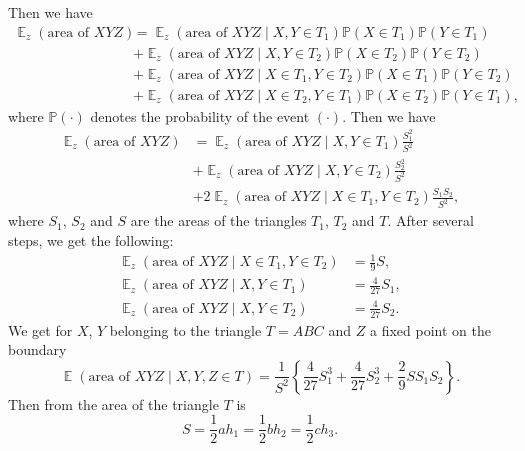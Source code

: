 \documentclass{article}
\DeclareMathOperator{\E}{\mathbb{E}}
\renewcommand{\P}{\mathbb{P}}
\begin{document}
Then we have
\begin{equation*}
    \begin{split}
        \E_{z}(\text{area of }XYZ) &= \E_{z}(\text{area of }XYZ\mid X, Y \in T_{1})\P(X\in T_{1})\P(Y\in T_{1})
        \\
        &+ \E_{z}(\text{area of }XYZ\mid X, Y \in T_{2})\P(X\in T_{2})\P(Y\in T_{2})
        \\
        &+ \E_{z}(\text{area of }XYZ\mid X \in T_{1}, Y \in T_{2})\P(X\in T_{1})\P(Y\in T_{2})
        \\
        &+ \E_{z}(\text{area of }XYZ\mid X \in T_{2}, Y \in T_{1})\P(X\in T_{2})\P(Y\in T_{1}),
    \end{split}
\end{equation*}
where $\P(\cdot)$ denotes the probability of the event $(\cdot)$.
Then we have
\begin{equation*}
    \begin{split}
        \E_{z}(\text{area of } XYZ) &= \E_{z}(\text{area of }XYZ\mid X, Y\in T_{1})\frac{S_{1}^{2}}{S^{2}}
        \\
        &+ \E_{z}(\text{area of }XYZ\mid X, Y\in T_{2})\frac{S_{2}^{2}}{S^{2}}
        \\
        &+ 2\E_{z}(\text{area of }XYZ\mid X\in T_{1},Y\in T_{2})\frac{S_{1}S_{2}}{S^{2}},
    \end{split}
\end{equation*}
where $S_{1}$, $S_{2}$ and $S$ are the areas of the triangles $T_{1}$, $T_{2}$ and $T$.
After several steps, we get the following:
\begin{equation*}
    \begin{split}
        \E_{z}(\text{area of }XYZ\mid X\in T_{1}, Y\in T_{2}) &= \frac{1}{9}S,
        \\
        \E_{z}(\text{area of }XYZ\mid X, Y\in T_{1}) &= \frac{4}{27}S_{1},
        \\
        \E_{z}(\text{area of }XYZ\mid X, Y\in T_{2}) &= \frac{4}{27}S_{2}.
    \end{split}
\end{equation*}
We get for $X$, $Y$ belonging to the triangle $T = ABC$ and $Z$ a fixed point on the boundary
\begin{equation*}
    \E(\text{area of } XYZ\mid X, Y, Z \in T) = \frac{1}{S^{2}}\left\{\frac{4}{27}S_{1}^{3} + \frac{4}{27}S_{2}^{3} + \frac{2}{9}SS_{1}S_{2}\right\}.
\end{equation*}
Then from the area of the triangle $T$ is
\begin{equation*}
    S = \frac{1}{2}ah_{1} = \frac{1}{2}bh_{2} = \frac{1}{2}ch_{3}.
\end{equation*}
\end{document}
